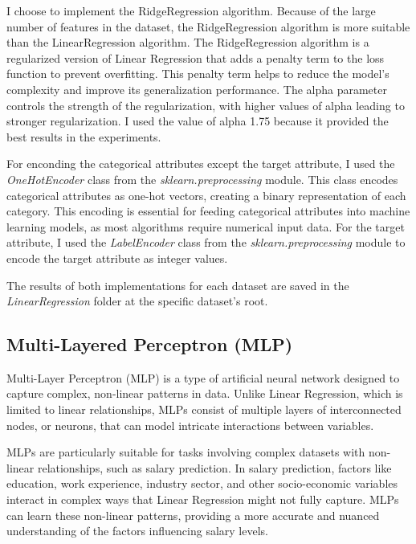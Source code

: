 \documentclass[runningheads]{paper}
\begin{document}
I choose to implement the RidgeRegression algorithm. Because of the large number of
features in the dataset, the RidgeRegression algorithm is more suitable than the
LinearRegression algorithm. The RidgeRegression algorithm is a regularized version
of Linear Regression that adds a penalty term to the loss function to prevent overfitting.
This penalty term helps to reduce the model's complexity and improve its generalization
performance. The alpha parameter controls the strength of the regularization, with
higher values of alpha leading to stronger regularization. I used the value of alpha
1.75 because it provided the best results in the experiments.

For enconding the categorical attributes except the target attribute, I used the
\textit{OneHotEncoder} class from the \textit{sklearn.preprocessing} module. This
class encodes categorical attributes as one-hot vectors, creating a binary representation
of each category. This encoding is essential for feeding categorical attributes into
machine learning models, as most algorithms require numerical input data. For the
target attribute, I used the \textit{LabelEncoder} class from the \textit{sklearn.preprocessing}
module to encode the target attribute as integer values.

The results of both implementations for each dataset are saved in the \textit{LinearRegression}
folder at the specific dataset's root.

\subsection{Multi-Layered Perceptron (MLP)}
Multi-Layer Perceptron (MLP) is a type of artificial neural network designed to 
capture complex, non-linear patterns in data. Unlike Linear Regression, which is
limited to linear relationships, MLPs consist of multiple layers of interconnected 
nodes, or neurons, that can model intricate interactions between variables.

MLPs are particularly suitable for tasks involving complex datasets with 
non-linear relationships, such as salary prediction. In salary prediction, 
factors like education, work experience, industry sector, and other 
socio-economic variables interact in complex ways that Linear Regression might 
not fully capture. MLPs can learn these non-linear patterns, providing a more 
accurate and nuanced understanding of the factors influencing salary levels.

\end{document}
